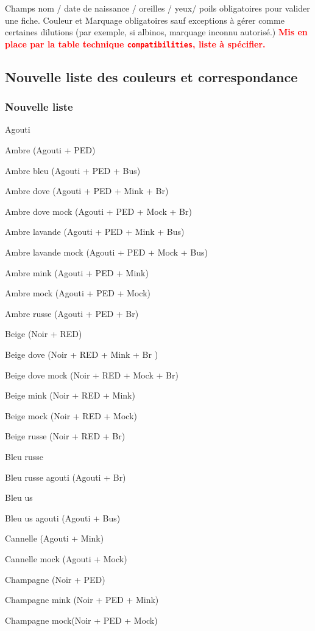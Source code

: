 \documentclass[a4paper,10pt]{article}
\newcommand\desire[1]{\noindent\textbf{\textcolor{red}{#1}}}
\begin{document}
Champs nom / date de naissance / oreilles / yeux/ poils obligatoires pour valider une fiche. Couleur et Marquage obligatoires sauf exceptions à gérer comme certaines dilutions (par exemple, si albinos, marquage inconnu autorisé.) \desire{Mis en place par la table technique \texttt{compatibilities}, liste à spécifier.}

\subsection{Nouvelle liste des couleurs et correspondance}
\subsubsection{Nouvelle liste}

Agouti

Ambre (Agouti + PED)
 
Ambre bleu   (Agouti + PED + Bus)
 
Ambre dove   (Agouti + PED + Mink + Br)
 
Ambre dove mock   (Agouti + PED + Mock + Br)
 
Ambre lavande (Agouti + PED + Mink +   Bus)
 
Ambre lavande mock (Agouti + PED + Mock   + Bus)
 
Ambre mink   (Agouti + PED + Mink)
 
Ambre mock (Agouti + PED + Mock)
 
Ambre russe (Agouti + PED + Br)
 
Beige (Noir + RED)
 
Beige dove (Noir   + RED + Mink + Br )
 
Beige dove mock (Noir + RED + Mock + Br)
 
Beige mink (Noir   + RED + Mink)
 
Beige mock (Noir + RED + Mock)
 
Beige russe (Noir + RED + Br)
 
Bleu russe
 
Bleu russe agouti (Agouti + Br)
 
Bleu us
 
Bleu us agouti   (Agouti + Bus)
 
Cannelle (Agouti + Mink)
 
Cannelle mock (Agouti + Mock)
 
Champagne (Noir + PED)
 
Champagne mink (Noir + PED + Mink)

Champagne mock(Noir + PED + Mock)
 
\end{document}
